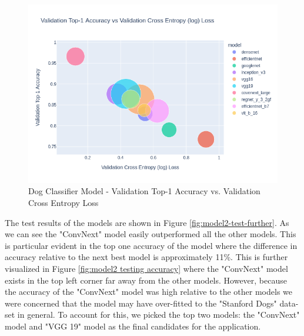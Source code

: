 \documentclass{article}
\begin{document}
\begin{figure}[h]
\centering
	\includegraphics[scale=0.60]{final-report-images/val_accuracy_comp_fig.png}
\caption{Dog Classifier Model - Validation Top-1 Accuracy vs. Validation Cross Entropy Loss}
\label{fig:model2 validation accuracy viz}
\end{figure}
\newpage

The test results of the models are shown in Figure \ref{fig:model2-test-further}.  As we can see the "ConvNext" model easily outperformed all the other models.  This is particular evident in the top one accuracy of the model where the difference in accuracy relative to the next best model is approximately 11\%.  This is further visualized in Figure \ref{fig:model2 testing accuracy} where the  "ConvNext" model exists in the top left corner far away from the other models.    However, because the accuracy of the "ConvNext" model was high relative to the other models we were concerned that the model may have over-fitted to the "Stanford Dogs" data-set \cite{stanforddogs} in general.  To account for this, we picked the top two models: the  "ConvNext" model and "VGG 19" model as the final candidates for the application.
\end{document}
